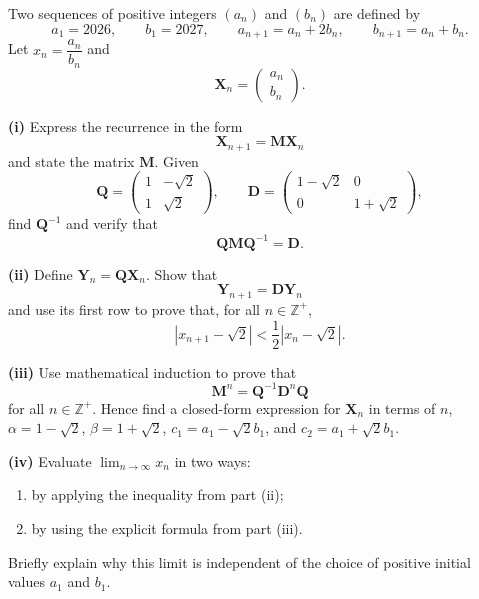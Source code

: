 \begin{problem}
Two sequences of positive integers $(a_n)$ and $(b_n)$ are defined by
\[
a_1=2026,\qquad b_1=2027,\qquad
a_{n+1}=a_n+2b_n,\qquad b_{n+1}=a_n+b_n.
\]
Let $x_n=\dfrac{a_n}{b_n}$ and
\[
\mathbf{X}_n=\begin{pmatrix}a_n\\b_n\end{pmatrix}.
\]

\textbf{(i)} Express the recurrence in the form
\[
\mathbf{X}_{n+1}=\mathbf{M}\mathbf{X}_n
\]
and state the matrix $\mathbf{M}$. Given
\[
\mathbf{Q}=\begin{pmatrix}1&-\sqrt{2}\\1&\sqrt{2}\end{pmatrix},
\qquad
\mathbf{D}=\begin{pmatrix}1-\sqrt{2}&0\\0&1+\sqrt{2}\end{pmatrix},
\]
find $\mathbf{Q}^{-1}$ and verify that
\[
\mathbf{Q}\mathbf{M}\mathbf{Q}^{-1}=\mathbf{D}.
\]

\textbf{(ii)} Define $\mathbf{Y}_n=\mathbf{Q}\mathbf{X}_n$. Show that
\[
\mathbf{Y}_{n+1}=\mathbf{D}\mathbf{Y}_n
\]
and use its first row to prove that, for all $n\in\mathbb{Z}^+$,
\[
\left|x_{n+1}-\sqrt{2}\right|
<\frac12\left|x_n-\sqrt{2}\right|.
\]

\textbf{(iii)} Use mathematical induction to prove that
\[
\mathbf{M}^n=\mathbf{Q}^{-1}\mathbf{D}^n\mathbf{Q}
\]
for all $n\in\mathbb{Z}^+$. Hence find a closed-form expression for $\mathbf{X}_n$ in terms of $n$, $\alpha=1-\sqrt{2}$, $\beta=1+\sqrt{2}$, $c_1=a_1-\sqrt{2}b_1$, and $c_2=a_1+\sqrt{2}b_1$.

\textbf{(iv)} Evaluate $\displaystyle\lim_{n\to\infty}x_n$ in two ways:
\begin{enumerate}[label=\arabic*.]
\item by applying the inequality from part (ii);
\item by using the explicit formula from part (iii).
\end{enumerate}
Briefly explain why this limit is independent of the choice of positive initial values $a_1$ and $b_1$.
\end{problem}

